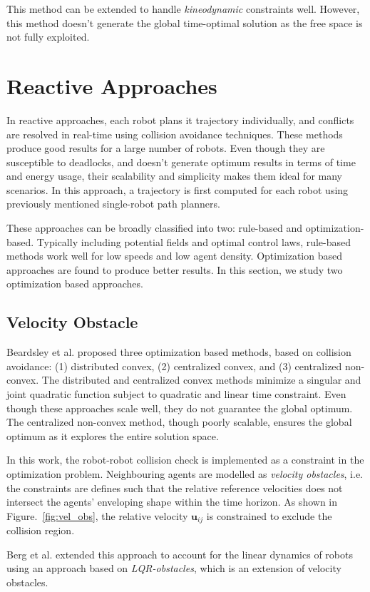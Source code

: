 This method can be extended to handle \textit{kineodynamic} constraints well. However, this method doesn't generate the global time-optimal solution as the free space is not fully exploited.
\section{Reactive Approaches}
In reactive approaches, each robot plans it trajectory individually, and conflicts are resolved in real-time using collision avoidance techniques. These methods produce good results for a large number of robots. Even though they are susceptible to deadlocks, and doesn't generate optimum results in terms of time and energy usage, their scalability and simplicity makes them ideal for many scenarios. In this approach, a trajectory is first computed for each robot using previously mentioned single-robot path planners. 

These approaches can be broadly classified into two: rule-based and optimization-based. Typically including potential fields and optimal control laws, rule-based methods work well for low speeds and low agent density. Optimization based approaches are found to produce better results. In this section, we study two optimization based approaches.
\subsection{Velocity Obstacle}
Beardsley et al. \cite{alonso2015collision} proposed three optimization based methods, based on collision avoidance: (1) distributed convex, (2) centralized convex, and (3) centralized non-convex. The distributed and centralized convex methods minimize a singular and joint quadratic function subject to quadratic and linear time constraint. Even though these approaches scale well, they do not guarantee the global optimum. The centralized non-convex method, though poorly scalable, ensures the global optimum as it explores the entire solution space. 

In this work, the robot-robot collision check is implemented as a constraint in the optimization problem. Neighbouring agents are modelled as \textit{velocity obstacles}, i.e. the constraints are defines such that the relative reference velocities does not intersect the agents' enveloping shape within the time horizon. As shown in Figure.~\ref{fig:vel_obs}, the relative velocity $\textbf{u}_{ij}$ is constrained to exclude the collision region. 

Berg et al. \cite{bareiss2013reciprocal} extended this approach to account for the linear dynamics of robots using an approach based on \textit{LQR-obstacles}, which is an extension of velocity obstacles.

